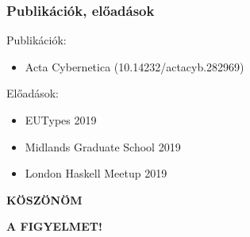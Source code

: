 \documentclass[bigger]{beamer}
\begin{document}
\begin{frame}[fragile]
	\frametitle{Publikációk, előadások}
	\begin{vfitemize}
		\item Publikációk:
		\begin{itemize}
			\item Acta Cybernetica (10.14232/actacyb.282969)
		\end{itemize}
		\item Előadások:
		\begin{itemize}
			\item EUTypes 2019
			\item Midlands Graduate School 2019
			\item London Haskell Meetup 2019
		\end{itemize}
	\end{vfitemize}
\end{frame}


{
	\begin{frame}{}
	
	\bigskip\bigskip\bigskip
	
	{\bf\Huge\color{white} KÖSZÖNÖM}

	
	\bigskip
	
	{\bf\Huge\color{white} A FIGYELMET!}
	
\end{frame}
}

\end{document}
